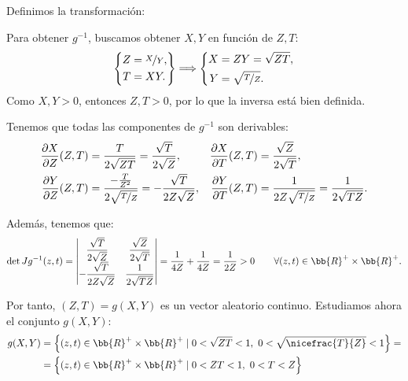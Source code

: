 \begin{ejercicio}
\begin{enumerate}
        Definimos la transformación:

        Para obtener $g^{-1}$, buscamos obtener $X,Y$ en función de $Z,T$:
        \begin{equation*}
            \left\{\begin{aligned}
                Z&=\nicefrac{X}{Y}, \\
                T&=XY.
            \end{aligned}\right\}\Longrightarrow
            \left\{\begin{aligned}
                X&=ZY=\sqrt{ZT}, \\
                Y&=\sqrt{\nicefrac{T}{Z}}.
            \end{aligned}\right.
        \end{equation*}
        Como $X,Y>0$, entonces $Z,T>0$, por lo que la inversa está bien definida.

        Tenemos que todas las componentes de $g^{-1}$ son derivables:
        \begin{align*}
            \dfrac{\partial X}{\partial Z}(Z,T)&=\dfrac{T}{2\sqrt{ZT}}=\dfrac{\sqrt{T}}{2\sqrt{Z}}, & \dfrac{\partial X}{\partial T}(Z,T)&=\dfrac{\sqrt{Z}}{2\sqrt{T}},\\
            \dfrac{\partial Y}{\partial Z}(Z,T)&=\dfrac{-\frac{T}{Z^2}}{2\sqrt{\nicefrac{T}{Z}}}=-\dfrac{\sqrt{T}}{2Z\sqrt{Z}}, & \dfrac{\partial Y}{\partial T}(Z,T)&=\dfrac{1}{2Z\sqrt{\nicefrac{T}{Z}}}=\dfrac{1}{2\sqrt{TZ}}.
        \end{align*}

        Además, tenemos que:
        \begin{equation*}
            \det Jg^{-1}(z,t)=\begin{vmatrix}
                \dfrac{\sqrt{T}}{2\sqrt{Z}} & \dfrac{\sqrt{Z}}{2\sqrt{T}} \\
                -\dfrac{\sqrt{T}}{2Z\sqrt{Z}} & \dfrac{1}{2\sqrt{TZ}}
            \end{vmatrix}=\dfrac{1}{4Z}+\dfrac{1}{4Z}=\frac{1}{2Z}>0 \qquad \forall (z,t)\in\bb{R}^+\times \bb{R}^+.
        \end{equation*}

        Por tanto, $(Z,T)=g(X,Y)$ es un vector aleatorio continuo. Estudiamos ahora el conjunto $g(X,Y)$:
        \begin{align*}
            g(X,Y)&=\left\{(z,t)\in \bb{R}^+\times \bb{R}^+\mid 0<\sqrt{ZT}<1,~0<\sqrt{\nicefrac{T}{Z}}<1\right\}
            =\\&= \left\{(z,t)\in \bb{R}^+\times \bb{R}^+\mid 0<ZT<1,~0<T<Z\right\}
        \end{align*}


\end{enumerate}
\end{ejercicio}

